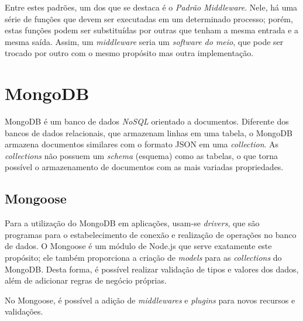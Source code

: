 Entre estes padrões, um dos que se destaca é o \textit{Padrão Middleware}. Nele, há uma série de funções que devem ser executadas em um determinado processo; porém, estas funções podem ser substituídas por outras que tenham a mesma entrada e a mesma saída. Assim, um \textit{middleware} seria um \textit{software do meio}, que pode ser trocado por outro com o mesmo propósito mas outra implementação.


\section{MongoDB}

MongoDB \cite{MONGODB} é um banco de dados \textit{NoSQL} \cite{NOSQLORG} orientado a documentos. Diferente dos bancos de dados relacionais, que armazenam linhas em uma tabela, o MongoDB armazena documentos similares com o formato JSON em uma \textit{collection}. As \textit{collections} não possuem um \textit{schema} (esquema) como as tabelas, o que torna possível o armazenamento de documentos com as mais variadas propriedades.


\subsection{Mongoose}

Para a utilização do MongoDB em aplicações, usam-se \textit{drivers}, que são programas para o estabelecimento de conexão e realização de operações no banco de dados. O Mongoose é um módulo de Node.js que serve exatamente este propósito; ele também proporciona a criação de \textit{models} para as \textit{collections} do MongoDB. Desta forma, é possível realizar validação de tipos e valores dos dados, além de adicionar regras de negócio próprias.

No Mongoose, é possível a adição de \textit{middlewares} e \textit{plugins} para novos recursos e validações.
